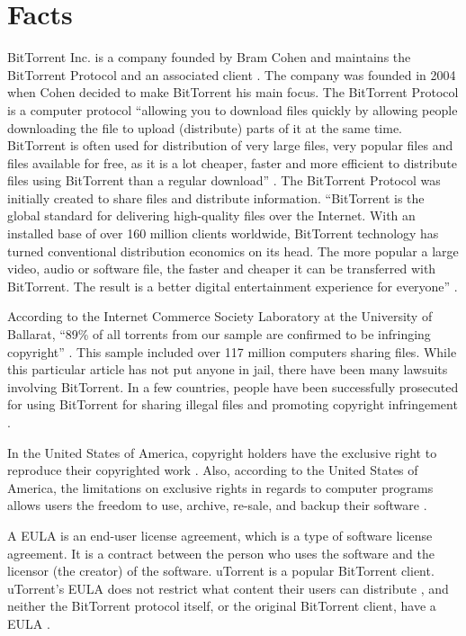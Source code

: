 \documentclass[11pt]{article}
\begin{document}
\section{Facts}
BitTorrent Inc. is a company founded by Bram Cohen and maintains the BitTorrent Protocol and an associated client \cite{btabout}. The company was founded in 2004 when Cohen decided to make BitTorrent his main focus. The BitTorrent Protocol is a computer protocol ``allowing you to download files quickly by allowing people downloading the file to upload (distribute) parts of it at the same time. BitTorrent is often used for distribution of very large files, very popular files and files available for free, as it is a lot cheaper, faster and more efficient to distribute files using BitTorrent than a regular download'' \cite{btabout}.  The BitTorrent Protocol was initially created to share files and distribute information. ``BitTorrent is the global standard for delivering high-quality files over the Internet. With an installed base of over 160 million clients worldwide, BitTorrent technology has turned conventional distribution economics on its head. The more popular a large video, audio or software file, the faster and cheaper it can be transferred with BitTorrent. The result is a better digital entertainment experience for everyone'' \cite{btabout}.

According to the Internet Commerce Society Laboratory at the University of Ballarat, ``89\% of all torrents from our sample are confirmed to be infringing copyright'' \cite{ICSL}. This sample included over 117 million computers sharing files. While this particular article has not put anyone in jail, there have been many lawsuits involving BitTorrent. In a few countries, people have been successfully prosecuted for using BitTorrent for sharing illegal files and promoting copyright infringement \cite{tpbverdict}.

In the United States of America, copyright holders have the exclusive right to reproduce their copyrighted work \cite{t17c1s106}. Also, according to the United States of America, the limitations on exclusive rights in regards to computer programs allows users the freedom to use, archive, re-sale, and backup their software \cite{t17s117}.

A EULA is an end-user license agreement, which is a type of software license agreement. It is a contract between the person who uses the software and the licensor (the creator) of the software. uTorrent is a popular BitTorrent client. uTorrent's EULA does not restrict what content their users can distribute \cite{utorrentEula}, and neither the BitTorrent protocol itself, or the original BitTorrent client, have a EULA \cite{utorrentEula}.
\end{document}
